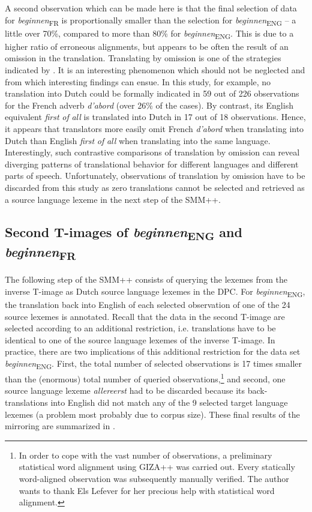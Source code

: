 A second observation which can be made here is that the final selection of data for \textit{beginnen}\textsubscript{FR} is proportionally smaller than the selection for \textit{beginnen}\textsubscript{ENG} – a little over 70\%, compared to more than 80\% for \textit{beginnen}\textsubscript{ENG}. This is due to a higher ratio of erroneous alignments, but appears to be often the result of an omission in the translation. Translating by omission is one of the strategies indicated by \citet[40]{baker_other_1992}. It is an interesting phenomenon which should not be neglected and from which interesting findings can ensue. In this study, for example, no translation into Dutch could be formally indicated in 59 out of 226 observations for the French adverb \textit{d’abord} (over 26\% of the cases). By contrast, its English equivalent \textit{first} \textit{of} \textit{all} is translated into Dutch in 17 out of 18 observations. Hence, it appears that translators more easily omit French \textit{d’abord} when translating into Dutch than English \textit{first} \textit{of} \textit{all} when translating into the same language. Interestingly, such contrastive comparisons of translation by omission can reveal diverging patterns of translational behavior for different languages and different parts of speech. Unfortunately, observations of translation by omission have to be discarded from this study as zero translations cannot be selected and retrieved as a source language lexeme in the next step of the SMM++.


\subsection{Second T-images of \textit{beginnen}\textsubscript{ENG}\textsubscript{} and \textit{beginnen}\textsubscript{FR}}
\label{sec:3.6.3}
The following step of the SMM++ consists of querying the lexemes from the inverse T-image as Dutch source language lexemes in the DPC. For \textit{beginnen}\textsubscript{ENG}, the translation back into English of each selected observation of one of the 24 source lexemes is annotated. Recall that the data in the second T-image are selected according to an additional restriction, i.e. translations have to be identical to one of the source language lexemes of the inverse T-image. In practice, there are two implications of this additional restriction for the data set \textit{beginnen}\textsubscript{ENG}. First, the total number of selected observations is 17 times smaller than the (enormous) total number of queried observations,\footnote{In order to cope with the vast number of observations, a preliminary statistical word alignment using GIZA++ was carried out. Every statically word-aligned observation was subsequently manually verified. The author wants to thank Els Lefever for her precious help with statistical word alignment.} and second, one source language lexeme \textit{allereerst} had to be discarded because its back-translations into English did not match any of the 9 selected target language lexemes (a problem most probably due to corpus size). These final results of the mirroring are summarized in .



